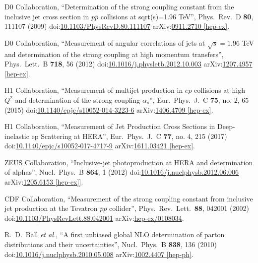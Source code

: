 \begin{thebibliography}{99}
D0 Collaboration, ``Determination of the strong coupling constant from the inclusive jet cross section in $p\bar{p}$ collisions at sqrt(s)=1.96 TeV'', Phys.\ Rev.\ D {\bf 80}, 111107 (2009) doi:\href{http://dx.doi.org/10.1103/PhysRevD.80.111107}{10.1103/PhysRevD.80.111107} arXiv:\href{https://arxiv.org/abs/0911.2710}{0911.2710 [hep-ex]}.

D0 Collaboration, ``Measurement of angular correlations of jets at $\sqrt{s}=1.96$ TeV and determination of the strong coupling at high momentum transfers'', Phys.\ Lett.\ B {\bf 718}, 56 (2012) doi:\href{http://dx.doi.org/10.1016/j.physletb.2012.10.003}{10.1016/j.physletb.2012.10.003} arXiv:\href{https://arxiv.org/abs/1207.4957}{1207.4957 [hep-ex]}.

H1 Collaboration, ``Measurement of multijet production in $ep$ collisions at high $Q^2$ and determination of the strong coupling $\alpha _s$'', Eur.\ Phys.\ J.\ C {\bf 75}, no. 2, 65 (2015) doi:\href{http://dx.doi.org/10.1140/epjc/s10052-014-3223-6}{10.1140/epjc/s10052-014-3223-6} arXiv:\href{https://arxiv.org/abs/1406.4709}{1406.4709 [hep-ex]}.

H1 Collaboration, ``Measurement of Jet Production Cross Sections in Deep-inelastic ep Scattering at HERA'', Eur.\ Phys.\ J.\ C {\bf 77}, no. 4, 215 (2017) doi:\href{http://dx.doi.org/10.1140/epjc/s10052-017-4717-9}{10.1140/epjc/s10052-017-4717-9} arXiv:\href{https://arxiv.org/abs/1611.03421}{1611.03421 [hep-ex]}.

ZEUS Collaboration, ``Inclusive-jet photoproduction at HERA and determination of alphas'', Nucl.\ Phys.\ B {\bf 864}, 1 (2012) doi:\href{http://dx.doi.org/10.1016/j.nuclphysb.2012.06.006}{10.1016/j.nuclphysb.2012.06.006} arXiv:\href{https://arxiv.org/abs/1205.6153}{1205.6153 [hep-ex]]}.

CDF Collaboration, ``Measurement of the strong coupling constant from inclusive jet production at the Tevatron $\bar{p}p$ collider'', Phys.\ Rev.\ Lett.\ {\bf 88}, 042001 (2002) doi:\href{http://dx.doi.org/10.1103/PhysRevLett.88.042001}{10.1103/PhysRevLett.88.042001} arXiv:\href{https://arxiv.org/pdf/hep-ex/0108034.pdf}{hep-ex/0108034}.

R.~D.~Ball {\it et al.}, ``A first unbiased global NLO determination of parton distributions and their uncertainties'', Nucl.\ Phys.\ B {\bf 838}, 136 (2010) doi:\href{http://dx.doi.org/10.1016/j.nuclphysb.2010.05.008}{10.1016/j.nuclphysb.2010.05.008} arXiv:\href{https://arxiv.org/abs/1002.4407}{1002.4407 [hep-ph]}.


\end{thebibliography}

